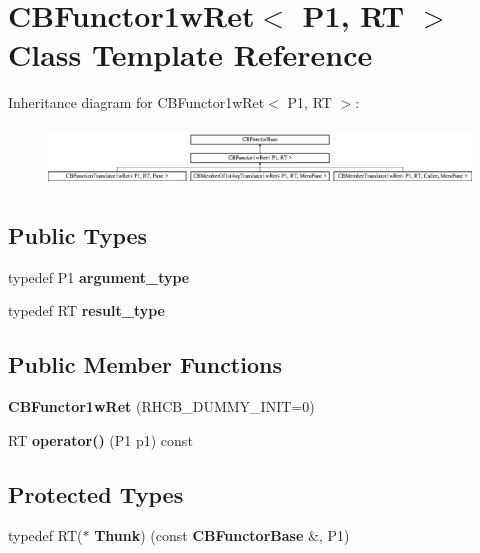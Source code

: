 \section{C\+B\+Functor1w\+Ret$<$ P1, RT $>$ Class Template Reference}
\label{classCBFunctor1wRet}
Inheritance diagram for C\+B\+Functor1w\+Ret$<$ P1, RT $>$\+:\begin{figure}[H]
\begin{center}
\leavevmode
\includegraphics[height=1.586402cm]{classCBFunctor1wRet}
\end{center}
\end{figure}
\subsection*{Public Types}
\begin{DoxyCompactItemize}
\item 
typedef P1 {\bfseries argument\+\_\+type}\label{classCBFunctor1wRet_a3b06b725cdb955ad2300fd32c18fabd0}

\item 
typedef RT {\bfseries result\+\_\+type}\label{classCBFunctor1wRet_aedd72816facfbae9a1dc7908b7f9eeef}

\end{DoxyCompactItemize}
\subsection*{Public Member Functions}
\begin{DoxyCompactItemize}
\item 
{\bfseries C\+B\+Functor1w\+Ret} (R\+H\+C\+B\+\_\+\+D\+U\+M\+M\+Y\+\_\+\+I\+N\+IT=0)\label{classCBFunctor1wRet_ae617d4cc3513b4d18de4fb38857b6c2c}

\item 
RT {\bfseries operator()} (P1 p1) const \label{classCBFunctor1wRet_afd89568c8af023ef3f509cd7e1e444a9}

\end{DoxyCompactItemize}
\subsection*{Protected Types}
\begin{DoxyCompactItemize}
\item 
typedef RT($\ast$ {\bfseries Thunk}) (const {\bf C\+B\+Functor\+Base} \&, P1)\label{classCBFunctor1wRet_ac3c4c79ce83a99130c7d46acd4b8b681}

\end{DoxyCompactItemize}
